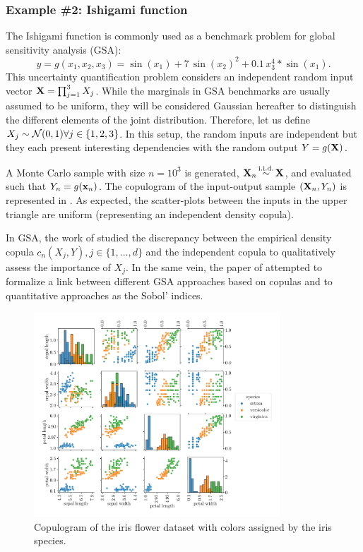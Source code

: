 \subsubsection{Example \#2: Ishigami function}

The Ishigami function is commonly used as a benchmark problem for global sensitivity analysis (GSA): 
\begin{equation}
    y = g(x_1, x_2, x_3) = \sin(x_1) + 7 \, \sin(x_2)^2 + 0.1 \, x_3^4 * \sin(x_1).
\end{equation}
This uncertainty quantification problem considers an independent random input vector ${\bf X}=\prod_{j=1}^{3} X_j$. 
While the marginals in GSA benchmarks are usually assumed to be uniform, they will be considered Gaussian hereafter to distinguish the different elements of the joint distribution. 
Therefore, let us define $X_j\sim \mathcal{N}(0, 1) \forall j \in \{1, 2, 3\}$. 
In this setup, the random inputs are independent but they each present interesting dependencies with the random output $Y=g({\bf X})$.

A Monte Carlo sample with size $n=10^3$ is generated, ${\bf X}_n \mathop{\sim}\limits^{\mathrm{i.i.d.}} {\bf X}$, and evaluated such that $Y_n=g({\bf x}_n)$.  
The copulogram of the input-output sample $({\bf X}_n, Y_n)$ is represented in . 
As expected, the scatter-plots between the inputs in the upper triangle are uniform (representing an independent density copula). 

In GSA, the work of \citet{poczos_2012_copulaMMD} studied the discrepancy between the empirical density copula $c_n(X_j, Y), j \in \{1, \dots, d\}$ and the independent copula to qualitatively assess the importance of $X_j$.  
In the same vein, the paper of \citet{plischke_2019_copulaGSA} attempted to formalize a link between different GSA approaches based on copulas and to quantitative approaches as the Sobol' indices. 

\begin{figure}
    \centering
    \quad\qquad\qquad\includegraphics[width=0.82\textwidth]{../numerical_experiments/chapter3/figures/iris_copulogram.png}
    \caption{Copulogram of the iris flower dataset with colors assigned by the iris species.}
    \label{fig:iris_copulogram}
\end{figure}

